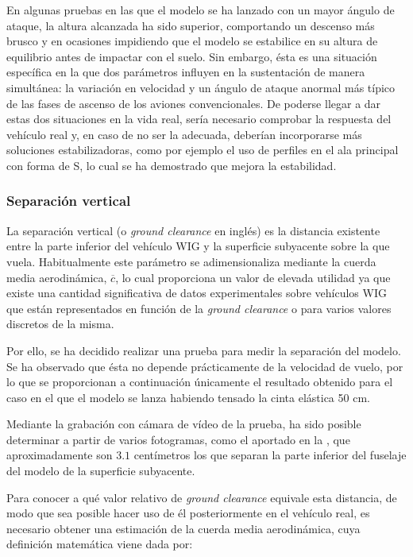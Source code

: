 En algunas pruebas en las que el modelo se ha lanzado con un mayor ángulo de ataque, la altura alcanzada ha sido superior, comportando un descenso más brusco y en ocasiones impidiendo que el modelo se estabilice en su altura de equilibrio antes de impactar con el suelo. Sin embargo, ésta es una situación específica en la que dos parámetros influyen en la sustentación de manera simultánea: la variación en velocidad y un ángulo de ataque anormal más típico de las fases de ascenso de los aviones convencionales. De poderse llegar a dar estas dos situaciones en la vida real, sería necesario comprobar la respuesta del vehículo real y, en caso de no ser la adecuada, deberían incorporarse más soluciones estabilizadoras, como por ejemplo el uso de perfiles en el ala principal con forma de S, lo cual se ha demostrado que mejora la estabilidad.\cite{ref:Sshaped}


\subsubsection{Separación vertical}
\label{sec:tests:results:clearance}

La separación vertical (o \emph{ground clearance} en inglés) es la distancia existente entre la parte inferior del vehículo WIG y la superficie subyacente sobre la que vuela. Habitualmente este parámetro se adimensionaliza mediante la cuerda media aerodinámica, $\overline{c}$, lo cual proporciona un valor de elevada utilidad ya que existe una cantidad significativa de datos experimentales sobre vehículos WIG que están representados en función de la \emph{ground clearance} o para varios valores discretos de la misma.

Por ello, se ha decidido realizar una prueba para medir la separación del modelo. Se ha observado que ésta no depende prácticamente de la velocidad de vuelo, por lo que se proporcionan a continuación únicamente el resultado obtenido para el caso en el que el modelo se lanza habiendo tensado la cinta elástica 50 cm.

Mediante la grabación con cámara de vídeo de la prueba, ha sido posible determinar a partir de varios fotogramas, como el aportado en la , que aproximadamente son $3.1$ centímetros los que separan la parte inferior del fuselaje del modelo de la superficie subyacente.

Para conocer a qué valor relativo de \emph{ground clearance} equivale esta distancia, de modo que sea posible hacer uso de él posteriormente en el vehículo real, es necesario obtener una estimación de la cuerda media aerodinámica, cuya definición matemática viene dada por:

